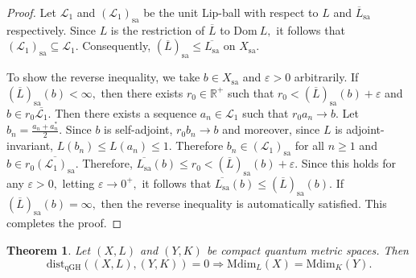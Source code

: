 \documentclass[a4paper,11pt,reqno]{amsart}
\theoremstyle{plain}
\newtheorem{thm}{Theorem}[section]
\theoremstyle{mainthmstyle}
\theoremstyle{named}
\numberwithin{equation}{section}
\begin{document}
\begin{proof}
Let $\mathcal L_1$ and $\left (\mathcal {L}_1 \right )_{\mathrm {sa}}$ be the unit Lip-ball with respect to $L$ and $\overline {L}_{\mathrm {sa}}$ respectively. Since $L$ is the restriction of $\overline {L}$ to $\mathrm {Dom}\ L,$ it follows that $\left (\mathcal {L}_1 \right )_{\mathrm {sa}} \subseteq \mathcal {L}_1.$ Consequently, $(\overline {L})_{\mathrm {sa}} \leq \overline {L_{\mathrm {sa}}}$ on $X_{\mathrm {sa}}.$

To show the reverse inequality, we take $b \in X_{\mathrm {sa}}$ and $\varepsilon > 0$ arbitrarily. If $(\overline {L})_{\mathrm {sa}} (b) < \infty,$ then there exists $r_0 \in \mathbb R^{+}$ such that $r_0 < (\overline {L})_{\mathrm {sa}} (b) + \varepsilon$ and $b \in r_0 \overline {\mathcal {L}_1}.$ Then there exists a sequence $a_n \in \mathcal {L}_1$ such that $r_0 a_n \to b.$ Let $b_n = \frac {a_n + a_n^{\ast}} {2}.$ Since $b$ is self-adjoint, $r_0 b_n \rightarrow b$ and moreover, since $L$ is adjoint-invariant, $L \left (b_n \right ) \leq L \left (a_n \right ) \leq 1.$ Therefore $b_n \in \left (\mathcal {L}_1 \right )_{\mathrm {sa}}$ for all $n \geq 1$ and $b \in r_0 \overline {\left (\mathcal {L}_1 \right )_{\mathrm {sa}}}.$ Therefore, $\overline {L_{\mathrm {sa}}} (b) \leq r_0 < (\overline {L})_{\mathrm {sa}} (b) + \varepsilon.$ Since this holds for any $\varepsilon > 0,$ letting $\varepsilon \rightarrow 0^{+},$ it follows that $\overline {L_{\mathrm {sa}}} (b) \leq (\overline {L})_{\mathrm {sa}} (b).$ If $(\overline {L})_{\mathrm {sa}} (b) = \infty,$ then the reverse inequality is automatically satisfied. This completes the proof.
\end{proof}


\begin{thm} \label{qGH vs Mdim}
Let $(X,L)$ and $(Y,K)$ be compact quantum metric spaces. Then \begin{displaymath}\mathrm {dist}_{\mathrm {qGH}} ((X, L), (Y, K)) = 0\Rightarrow \mathrm {Mdim}_{L} (X) = \mathrm {Mdim}_{K} (Y).\end{displaymath}
\end{thm}
\end{document}
